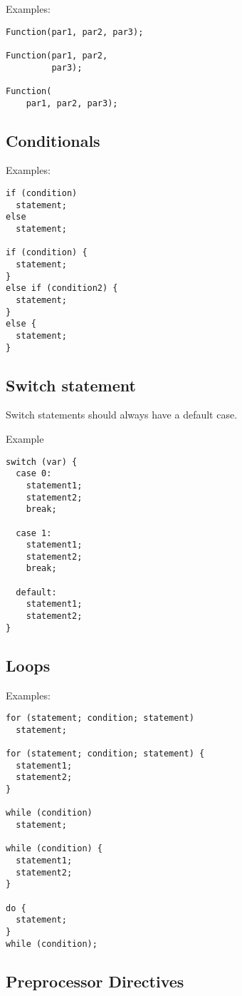 \documentclass[a4paper]{article}
\begin{document}
Examples:
\begin{lstlisting}
Function(par1, par2, par3);

Function(par1, par2,
         par3);

Function(
    par1, par2, par3);
\end{lstlisting}

\subsection{Conditionals}

Examples:
\begin{lstlisting}
if (condition)
  statement;
else
  statement;

if (condition) {
  statement;
}
else if (condition2) {
  statement;
}
else {
  statement;
}
\end{lstlisting}

\subsection{Switch statement}

Switch statements should always have a default case.

Example
\begin{lstlisting}
switch (var) {
  case 0:
    statement1;
    statement2;
    break;

  case 1:
    statement1;
    statement2;
    break;

  default:
    statement1;
    statement2;
}
\end{lstlisting}

\subsection{Loops}

Examples:
\begin{lstlisting}
for (statement; condition; statement)
  statement;

for (statement; condition; statement) {
  statement1;
  statement2;
}

while (condition)
  statement;

while (condition) {
  statement1;
  statement2;
}

do {
  statement;
}
while (condition);
\end{lstlisting}

\subsection{Preprocessor Directives}
\end{document}
